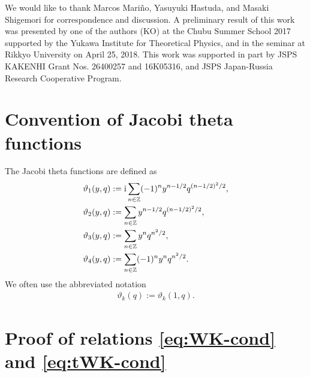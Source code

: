 \documentclass[11pt]{article}
\newcommand{\ri}{{\rm i}}
\newcommand{\nn}{\nonumber}
\renewcommand{\[}{\begin{eqnarray}}
\renewcommand{\]}{\end{eqnarray}}
\newcommand{\varth}{\vartheta}
\newcommand{\bbZ}{{\mathbb Z}}
\begin{document}
\vskip8mm
\acknowledgments
We would like to thank Marcos Mari\~{n}o,  Yasuyuki Hastuda, and Masaki Shigemori for correspondence and discussion.
A preliminary result of this work was presented by one of the authors
(KO) at the Chubu Summer School 2017 supported by the Yukawa Institute
for Theoretical Physics, and in the seminar at Rikkyo University on April 25, 2018.
This work was supported in part by JSPS KAKENHI Grant Nos. 
26400257  and 16K05316,
and JSPS Japan-Russia Research Cooperative Program.


\appendix
\section{Convention of Jacobi theta functions \label{app:notation}}

The Jacobi theta functions are defined as
%
\begin{align}
\varth_1(y,q)&:=
 \ri\sum_{n\in\bbZ}(-1)^n y^{n-1/2}q^{(n-1/2)^2/2},\nn\\
\varth_2(y,q)&:=
  \sum_{n\in\bbZ}y^{n-1/2}q^{(n-1/2)^2/2},\nn\\
\varth_3(y,q)&:=
  \sum_{n\in\bbZ}y^n q^{n^2/2},\nn\\
\varth_4(y,q)&:=
  \sum_{n\in\bbZ}(-1)^n y^n q^{n^2/2}.
\end{align}
%
We often use the abbreviated notation
%
\[
\varth_k(q):=\varth_k(1,q).
\]
%

\section{Proof of relations \eqref{eq:WK-cond} and \eqref{eq:tWK-cond}
         \label{app:Zfullproof}}
\end{document}

